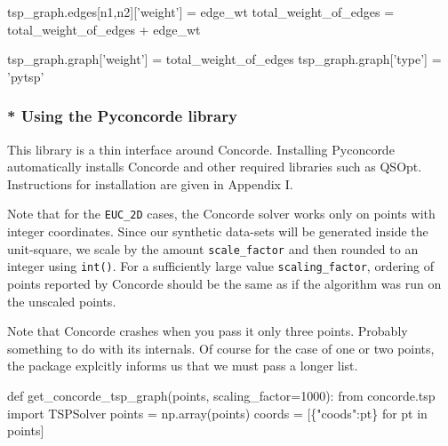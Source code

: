       tsp_graph.edges[n1,n2]['weight'] = edge_wt
      total_weight_of_edges = total_weight_of_edges + edge_wt 
\nwendcode{}\nwdocspar

\nwenddocs{}\endmoddef\nwstartdeflinemarkup{}\nwenddeflinemarkup
tsp_graph.graph['weight'] = total_weight_of_edges
tsp_graph.graph['type']   = 'pytsp'
\nwendcode{}\nwdocspar

\subsubsection{* Using the Pyconcorde library}

This library is a thin interface around Concorde. Installing Pyconcorde
automatically installs Concorde and other required libraries such as QSOpt. 
Instructions for installation are given in Appendix I.  

Note that for the \verb|EUC_2D| cases, the Concorde solver works only on 
points with integer coordinates. Since our synthetic data-sets will be 
generated inside the unit-square, we scale by the amount \verb|scale_factor| 
and then rounded to an integer using \verb|int()|. For a sufficiently large 
value \verb|scaling_factor|, ordering of points reported by Concorde 
should be the same as  if the algorithm was run on the unscaled points. 

Note that Concorde crashes when you pass it only three points. Probably something to do with
its internals. Of course for the case of one or two points, the package explcitly informs us that we must pass
a longer list. 

\nwenddocs{}\plusendmoddef\nwstartdeflinemarkup{}\nwenddeflinemarkup
def get_concorde_tsp_graph(points, scaling_factor=1000):
     from concorde.tsp import TSPSolver
     points = np.array(points)
     coords = [\{"coods":pt\} for pt in points]

